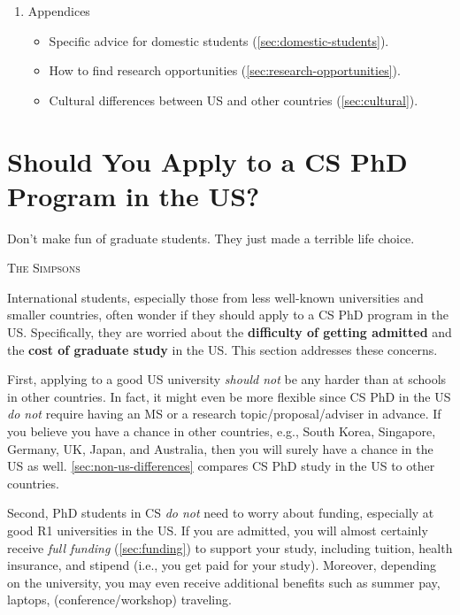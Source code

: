 \documentclass[oneside,11pt,dvipsnames]{book}
\begin{document}
\begin{enumerate}
    \item Appendices
    \begin{itemize}
      \item Specific advice for domestic students (\autoref{sec:domestic-students}).
      \item How to find research opportunities (\autoref{sec:research-opportunities}).
      \item Cultural differences between US and other countries (\autoref{sec:cultural}).
    \end{itemize}

\end{enumerate}


\mainmatter
\chapter{Should You Apply to a CS PhD Program in the US?}\label{sec:should}

\epigraph{\vspace{-0.2in} Don't make fun of graduate students. They just made a terrible life choice.}{\textsc{The Simpsons}}

International students, especially those from less well-known universities and smaller countries, often wonder if they should apply to a CS PhD program in the US. Specifically, they are worried about the \textbf{difficulty of getting admitted} and the \textbf{cost of graduate study} in the US. This section addresses these concerns.


First, applying to a good US university \emph{should not} be any harder than at schools in other countries. In fact, it might even be more flexible since CS PhD in the US \emph{do not} require having an MS or a research topic/proposal/adviser in advance. If you believe you have a chance in other countries, e.g., South Korea, Singapore, Germany, UK, Japan, and Australia, then you will surely have a chance in the US as well. \autoref{sec:non-us-differences} compares CS PhD study in the US to other countries.


Second, PhD students in CS \emph{do not} need to worry about funding, especially at good R1
universities in the US. If you are admitted, you will almost certainly
receive \emph{full funding} (\autoref{sec:funding}) to support your study, including tuition,
health insurance, and stipend (i.e., you get paid for your study). Moreover, depending on the university,
you may even receive additional benefits such as summer pay, laptops, (conference/workshop) traveling.
\end{document}
